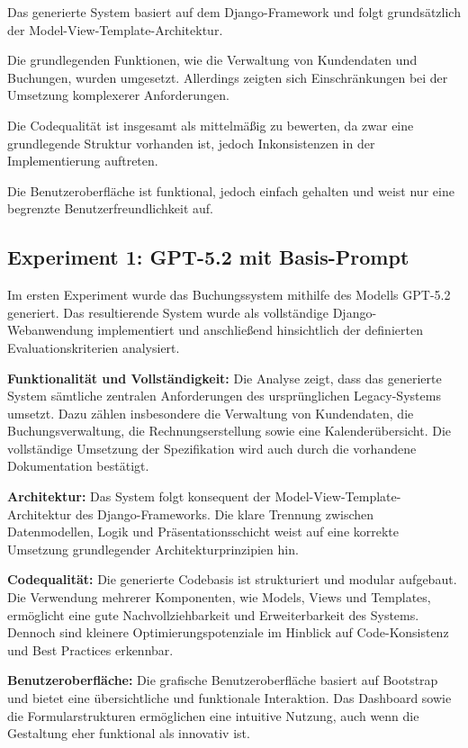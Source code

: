 Das generierte System basiert auf dem Django-Framework
und folgt grundsätzlich der Model-View-Template-Architektur.

Die grundlegenden Funktionen, wie die Verwaltung von
Kundendaten und Buchungen, wurden umgesetzt. Allerdings
zeigten sich Einschränkungen bei der Umsetzung komplexerer
Anforderungen.

Die Codequalität ist insgesamt als mittelmäßig zu bewerten,
da zwar eine grundlegende Struktur vorhanden ist, jedoch
Inkonsistenzen in der Implementierung auftreten.

Die Benutzeroberfläche ist funktional, jedoch einfach
gehalten und weist nur eine begrenzte Benutzerfreundlichkeit
auf.

\subsection{Experiment 1: GPT-5.2 mit Basis-Prompt}

Im ersten Experiment wurde das Buchungssystem
mithilfe des Modells GPT-5.2 generiert. Das resultierende
System wurde als vollständige Django-Webanwendung
implementiert und anschließend hinsichtlich der definierten
Evaluationskriterien analysiert.

\textbf{Funktionalität und Vollständigkeit:}
Die Analyse zeigt, dass das generierte System sämtliche
zentralen Anforderungen des ursprünglichen Legacy-Systems
umsetzt. Dazu zählen insbesondere die Verwaltung von
Kundendaten, die Buchungsverwaltung, die
Rechnungserstellung sowie eine Kalenderübersicht.
Die vollständige Umsetzung der Spezifikation wird auch
durch die vorhandene Dokumentation bestätigt.

\textbf{Architektur:}
Das System folgt konsequent der Model-View-Template-
Architektur des Django-Frameworks. Die klare Trennung
zwischen Datenmodellen, Logik und Präsentationsschicht
weist auf eine korrekte Umsetzung grundlegender
Architekturprinzipien hin.

\textbf{Codequalität:}
Die generierte Codebasis ist strukturiert und modular
aufgebaut. Die Verwendung mehrerer Komponenten, wie
Models, Views und Templates, ermöglicht eine gute
Nachvollziehbarkeit und Erweiterbarkeit des Systems.
Dennoch sind kleinere Optimierungspotenziale im Hinblick
auf Code-Konsistenz und Best Practices erkennbar.

\textbf{Benutzeroberfläche:}
Die grafische Benutzeroberfläche basiert auf Bootstrap
und bietet eine übersichtliche und funktionale
Interaktion. Das Dashboard sowie die Formularstrukturen
ermöglichen eine intuitive Nutzung, auch wenn die
Gestaltung eher funktional als innovativ ist.

